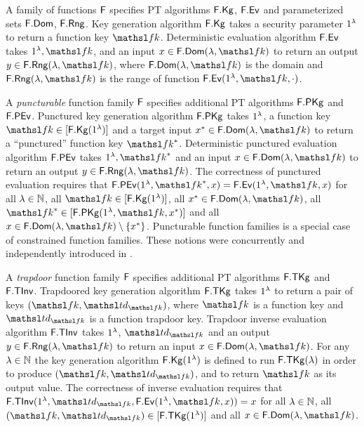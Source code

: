 
A family of functions $\mathsf{F}$ specifies PT algorithms $\mathsf{F}.\mathsf{Kg}$, $\mathsf{F}.\mathsf{Ev}$ and parameterized sets $\mathsf{F}.\mathsf{Dom}$, $\mathsf{F}.\mathsf{Rng}$.
Key generation algorithm $\mathsf{F}.\mathsf{Kg}$ takes a security parameter $1^\lambda$ to return a function key $\FKey$.
Deterministic evaluation algorithm $\mathsf{F}.\mathsf{Ev}$ takes $\secIn, \FKey$, and an input $x\in\Dom{\FF}(\secParam, \FKey)$ to return an output $y\in\Rng{\FF}(\secParam, \FKey)$, where $\Dom{\FF}(\secParam, \FKey)$ is the domain and $\Rng{\FF}(\secParam, \FKey)$ is the range of function $\Ev{\FF}(\secIn, \FKey, \cdot)$.

A \emph{puncturable} function family $\mathsf{F}$ specifies additional PT algorithms $\mathsf{F}.\mathsf{PKg}$ and $\mathsf{F}.\mathsf{PEv}$.
Punctured key generation algorithm $\mathsf{F}.\mathsf{PKg}$ takes $1^\lambda$, a function key $\FKey\in[\Kg{\FF}(\secIn)]$ and a target input $x^*\in\Dom{\FF}(\secParam,\FKey)$ to return a ``punctured'' function key $\PFKey$.
Deterministic punctured evaluation algorithm $\mathsf{F}.\mathsf{PEv}$ takes $\secIn, \PFKey$ and an input $x\in\Dom{\FF}(\secParam,\FKey)$ to return an output $y\in\Rng{\FF}(\secParam, \FKey)$.
The correctness of punctured evaluation requires that $\PEv{\FF}(\secIn, \PFKey, x) = \Ev{\FF}(\secIn, \FKey, x)$ for
  all $\lambda\in{{\mathbb N}}$,
  all $\FKey\in[\Kg{\FF}(\secIn)]$,
  all $x^*\in\Dom{\FF}(\secParam, \FKey)$,
  all $\PFKey\in[\PKg{\FF}(\secIn, \FKey, x^*)]$
  and all $x\in\Dom{\FF}(\secParam, \FKey)\setminus\{x^*\}$.
Puncturable function families is a special case of constrained function families.
These notions were concurrently and independently introduced in \cite{AC:BonWat13,CCS:KPTZ13,PKC:BoyGolIva14}.

A \emph{trapdoor} function family $\mathsf{F}$ specifies additional PT algorithms $\mathsf{F}.\mathsf{TKg}$ and $\mathsf{F}.\mathsf{TInv}$.
Trapdoored key generation algorithm $\mathsf{F}.\mathsf{TKg}$ takes $1^\lambda$ to return a pair of keys $(\FKey, \TFKey)$, where $\FKey$ is a function key and $\TFKey$ is a function trapdoor key.
Trapdoor inverse evaluation algorithm $\mathsf{F}.\mathsf{TInv}$ takes $1^\lambda$, $\TFKey$ and an output $y\in\Rng{\FF}(\secParam, \FKey)$ to return an input $x\in\Dom{\FF}(\secParam, \FKey)$.
For any $\lambda\in{{\mathbb N}}$ the key generation algorithm $\mathsf{F}.\mathsf{Kg}(1^\lambda)$ is defined to run $\mathsf{F}.\mathsf{TKg}(\lambda)$ in order to produce $(\FKey, \TFKey)$, and to return $\FKey$ as its output value.
The correctness of inverse evaluation requires that $\TInv{\FF}(\secIn, \TFKey, \Ev{\FF}(\secIn, \FKey, x)) = x$ for all $\lambda\in{{\mathbb N}}$, all $(\FKey, \TFKey)\in[\TKg{\FF}(\secIn)]$ and all $x\in\Dom{\FF}(\secParam, \FKey)$.

